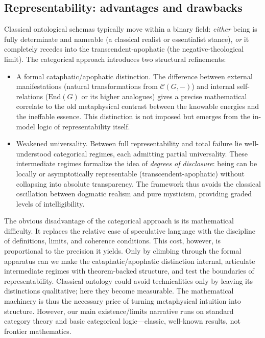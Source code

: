 \documentclass[11pt]{article}
\theoremstyle{upright}
\begin{document}
\subsection{Representability: advantages and drawbacks}

Classical ontological schemas typically move within a binary field: \emph{either} being is fully determinate and nameable (a classical realist or essentialist stance), \emph{or} it completely recedes into the transcendent-apophatic (the negative-theological limit). The categorical approach introduces two structural refinements:

\begin{itemize}
\item A formal cataphatic/apophatic distinction. The difference between external manifestations (natural transformations from $\mathcal C(G,-)$) and internal self-relations ($\mathrm{End}(G)$ or its higher analogues) gives a precise mathematical correlate to the old metaphysical contrast between the knowable energies and the ineffable essence. This distinction is not imposed but emerges from the in-model logic of representability itself.
\item Weakened universality. Between full representability and total failure lie well-understood categorical regimes, each admitting partial universality. These intermediate regimes formalize the idea of \emph{degrees of disclosure}: being can be locally or asymptotically representable (transcendent-apophatic) without collapsing into absolute transparency. The framework thus avoids the classical oscillation between dogmatic realism and pure mysticism, providing graded levels of intelligibility.
\end{itemize}

The obvious disadvantage of the categorical approach is its mathematical difficulty. It replaces the relative ease of speculative language with the discipline of definitions, limits, and coherence conditions. This cost, however, is proportional to the precision it yields. Only by climbing through the formal apparatus can we make the cataphatic/apophatic distinction internal, articulate intermediate regimes with theorem-backed structure, and test the boundaries of representability. Classical ontology could avoid technicalities only by leaving its distinctions qualitative; here they become measurable. The mathematical machinery is thus the necessary price of turning metaphysical intuition into structure. However, our main existence/limits narrative runs on standard category theory and basic categorical logic---classic, well-known results, not frontier mathematics.
\end{document}
